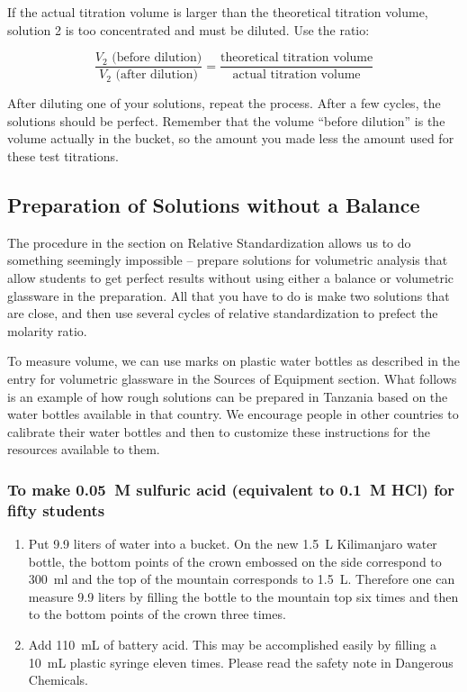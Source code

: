 If the actual titration volume is larger than the theoretical titration volume, solution 2 is too concentrated and must be diluted. Use the ratio:

\[ \frac{V_{2} \mbox{ (before dilution)}}{V_{2} \mbox{ (after dilution)}} = \frac{\mbox{theoretical titration volume}}{\mbox{actual titration volume}} \]

After diluting one of your solutions, repeat the process. After a few cycles, the solutions should be perfect. Remember that the volume ``before dilution'' is the volume actually in the bucket, so the amount you made less the amount used for these test titrations.

\subsection{Preparation of Solutions without a Balance}

The procedure in the section on Relative Standardization allows us to do something seemingly impossible – prepare solutions for volumetric analysis that allow students to get perfect results without using either a balance or volumetric glassware in the preparation. All that you have to do is make two solutions that are close, and then use several cycles of relative standardization to prefect the molarity ratio. 

To measure volume, we can use marks on plastic water bottles as described in the entry for volumetric glassware in the Sources of Equipment section. What follows is an example of how rough solutions can be prepared in Tanzania based on the water bottles available in that country. We encourage people in other countries to calibrate their water bottles and then to customize these instructions for the resources available to them.

\subsubsection{To make 0.05~M sulfuric acid (equivalent to 0.1~M HCl) for fifty students}
\begin{enumerate}
\item{Put 9.9 liters of water into a bucket. On the new 1.5~L Kilimanjaro water bottle, the bottom points of the crown embossed on the side correspond to 300~ml and the top of the mountain corresponds to 1.5~L. Therefore one can measure 9.9 liters by filling the bottle to the mountain top six times and then to the bottom points of the crown three times.}
\item{Add 110~mL of battery acid. This may be accomplished easily by filling a 10~mL plastic syringe eleven times. Please read the safety note in Dangerous Chemicals.}
\end{enumerate}

